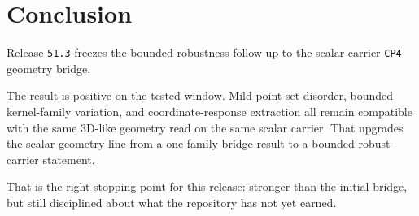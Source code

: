 \documentclass[11pt]{article}
\begin{document}
\section{Conclusion}

Release \texttt{51.3} freezes the bounded robustness follow-up to the scalar-carrier \texttt{CP4} geometry bridge.

The result is positive on the tested window. Mild point-set disorder, bounded kernel-family variation, and coordinate-response extraction all remain compatible with the same 3D-like geometry read on the same scalar carrier. That upgrades the scalar geometry line from a one-family bridge result to a bounded robust-carrier statement.

That is the right stopping point for this release: stronger than the initial bridge, but still disciplined about what the repository has not yet earned.
\end{document}
